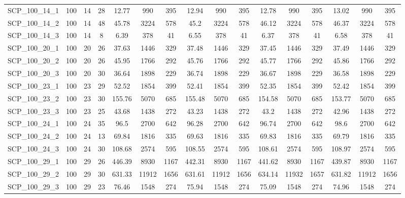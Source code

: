 \begin{sidewaystable}[!ht]
{\begin{tabular}{lccccccccccccccc}
SCP\_100\_14\_1 & 100 & 14 & 28 & 12.77 & 990 & 395 & 12.94 & 990 & 395 & 12.78 & 990 & 395 & 13.02 & 990 & 395 \\
SCP\_100\_14\_2 & 100 & 14 & 48 & 45.78 & 3224 & 578 &  \textcolor{blue2}{45.2} & 3224 & 578 & 46.12 & 3224 & 578 & 46.37 & 3224 & 578 \\
SCP\_100\_14\_3 & 100 & 14 & 8 & 6.39 & 378 & 41 & 6.55 & 378 & 41 &  \textcolor{blue2}{6.37} & 378 & 41 & 6.58 & 378 & 41 \\
SCP\_100\_20\_1 & 100 & 20 & 26 & 37.63 & 1446 & 329 & 37.48 & 1446 & 329 &  \textcolor{blue2}{37.45} & 1446 & 329 & 37.49 & 1446 & 329 \\
SCP\_100\_20\_2 & 100 & 20 & 26 & 45.95 & 1766 & 292 &  \textcolor{blue2}{45.76} & 1766 & 292 & 45.77 & 1766 & 292 & 45.86 & 1766 & 292 \\
SCP\_100\_20\_3 & 100 & 20 & 30 & 36.64 & 1898 & 229 & 36.74 & 1898 & 229 & 36.67 & 1898 & 229 & 36.58 & 1898 & 229 \\
SCP\_100\_23\_1 & 100 & 23 & 29 & 52.52 & 1854 & 399 & 52.41 & 1854 & 399 &  \textcolor{blue2}{52.35} & 1854 & 399 & 52.42 & 1854 & 399 \\
SCP\_100\_23\_2 & 100 & 23 & 30 & 155.76 & 5070 & 685 & 155.48 & 5070 & 685 & 154.58 & 5070 & 685 &  \textcolor{blue2}{153.77} & 5070 & 685 \\
SCP\_100\_23\_3 & 100 & 23 & 25 & 43.68 & 1438 & 272 & 43.23 & 1438 & 272 & 43.2 & 1438 & 272 &  \textcolor{blue2}{42.96} & 1438 & 272 \\
SCP\_100\_24\_1 & 100 & 24 & 35 & 96.5 & 2700 & 642 &  \textcolor{blue2}{96.28} & 2700 & 642 & 96.74 & 2700 & 642 & 98.6 & 2700 & 642 \\
SCP\_100\_24\_2 & 100 & 24 & 13 & 69.84 & 1816 & 335 & 69.63 & 1816 & 335 & 69.83 & 1816 & 335 & 69.79 & 1816 & 335 \\
SCP\_100\_24\_3 & 100 & 24 & 30 & 108.68 & 2574 & 595 &  \textcolor{blue2}{108.55} & 2574 & 595 & 108.61 & 2574 & 595 & 108.97 & 2574 & 595 \\
SCP\_100\_29\_1 & 100 & 29 & 26 & 446.39 & 8930 & 1167 & 442.31 & 8930 & 1167 & 441.62 & 8930 & 1167 &  \textcolor{blue2}{439.87} & 8930 & 1167 \\
SCP\_100\_29\_2 & 100 & 29 & 30 &  \textcolor{blue2}{631.33} & 11912 & 1656 & 631.61 & 11912 & 1656 & 634.14 & 11932 & 1657 & 631.82 & 11912 & 1656 \\
SCP\_100\_29\_3 & 100 & 29 & 23 & 76.46 & 1548 & 274 & 75.94 & 1548 & 274 & 75.09 & 1548 & 274 &  \textcolor{blue2}{74.96} & 1548 & 274 \\

\end{tabular}}
\end{sidewaystable}
